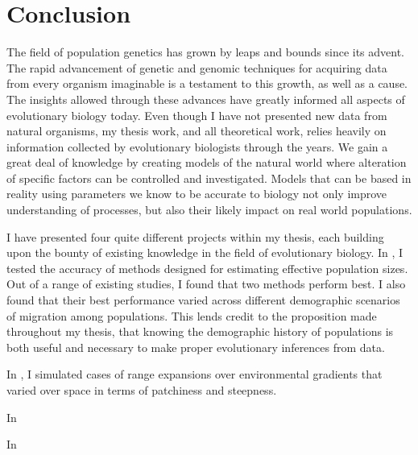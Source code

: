 \chapter{Conclusion}
\label{chap:conclusions}

The field of population genetics has grown by leaps and bounds since its advent. The rapid advancement of genetic and genomic techniques for acquiring data from every organism imaginable is a testament to this growth, as well as a cause. The insights allowed through these advances have greatly informed all aspects of evolutionary biology today. Even though I have not presented new data from natural organisms, my thesis work, and all theoretical work, relies heavily on information collected by evolutionary biologists through the years. We gain a great deal of knowledge by creating models of the natural world where alteration of specific factors can be controlled and investigated. Models that can be based in reality using parameters we know to be accurate to biology not only improve understanding of processes, but also their likely impact on real world populations.

I have presented four quite different projects within my thesis, each building upon the bounty of existing knowledge in the field of evolutionary biology. In , I tested the accuracy of methods designed for estimating effective population sizes. Out of a range of existing studies, I found that two methods perform best. I also found that their best performance varied across different demographic scenarios of migration among populations. This lends credit to the proposition made throughout my thesis, that knowing the demographic history of populations is both useful and necessary to make proper evolutionary inferences from data.

In , I simulated cases of range expansions over environmental gradients that varied over space in terms of patchiness and steepness.

In 

In 

